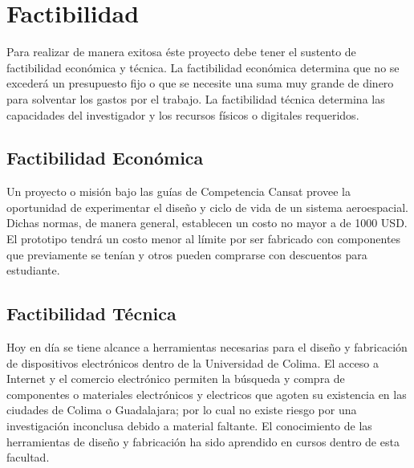 \section{Factibilidad}
Para realizar de manera exitosa \'{e}ste proyecto debe tener el sustento de factibilidad econ\'{o}mica y t\'{e}cnica. La factibilidad econ\'{o}mica determina que no se exceder\'{a} un presupuesto fijo o que se necesite una suma muy grande de dinero para solventar los gastos por el trabajo. La factibilidad t\'{e}cnica determina las capacidades del investigador y los recursos f\'{i}sicos o digitales requeridos.

\subsection{Factibilidad Econ\'{o}mica}
Un proyecto o misi\'{o}n bajo las gu\'{i}as de Competencia Cansat provee la oportunidad de experimentar el dise\~{n}o y ciclo de vida de un sistema aeroespacial. Dichas normas, de manera general, establecen un costo no mayor a de 1000 USD. El prototipo tendr\'{a} un costo menor al l\'{i}mite por ser fabricado con componentes que previamente se ten\'{i}an y otros pueden comprarse con descuentos para estudiante.

\subsection{Factibilidad T\'{e}cnica}


Hoy en d\'{i}a se tiene alcance a herramientas necesarias para el dise\~{n}o y fabricaci\'{o}n de dispositivos electr\'{o}nicos dentro de la Universidad de Colima. El acceso a Internet y el comercio electr\'{o}nico permiten la b\'{u}squeda y compra de componentes o materiales electr\'{o}nicos y electricos que agoten su existencia en las ciudades de Colima o Guadalajara; por lo cual no existe riesgo por una investigaci\'{o}n inconclusa debido a material faltante. El conocimiento de las herramientas de dise\~{n}o y fabricaci\'{o}n ha sido aprendido en cursos dentro de esta facultad.





